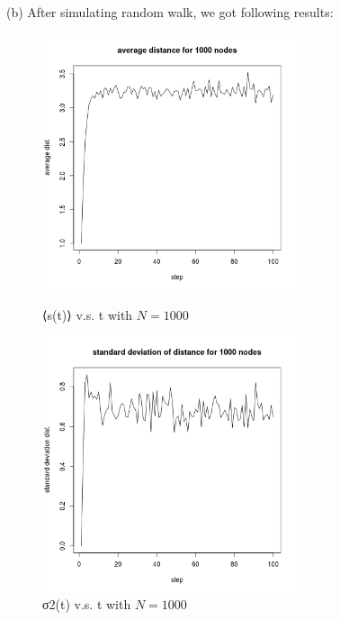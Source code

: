 \documentclass[draftcls,12pt,onecolumn]{IEEEtran}
\begin{document}
(b) After simulating random walk, we got following results:
\begin{figure}[htbp]
\centering
\begin{minipage}[t]{0.48\textwidth}
\centering
\includegraphics[width=7.5cm]{2_1_b_distance.png}
\caption{⟨s(t)⟩ v.s. t with $N = 1000$}
\end{minipage}
\begin{minipage}[t]{0.48\textwidth}
\centering
\includegraphics[width=7.5cm]{2_1_b_deviation.png}
\caption{σ2(t) v.s. t with $N = 1000$}
\end{minipage}
\end{figure}
\end{document}
